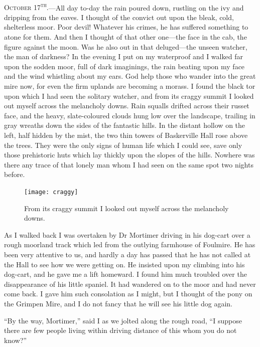 \documentclass[paper=5.5in:8.5in,BCOR=7mm,twoside,DIV=calc,12pt,usegeometry,openany,chapterprefix,endperiod]{scrbook} %
\begin{document}
~\\

\textsc{October 17\textsuperscript{th}.}\nobreakdash---All day to-day the rain poured down, rustling on the ivy and dripping from the eaves. I thought of the convict out upon the bleak, cold, shelterless moor. Poor devil! Whatever his crimes, he has suffered something to atone for them. And then I thought of that other one\nobreakdash---the face in the cab, the figure against the moon. Was he also out in that deluged\nobreakdash---the unseen watcher, the man of darkness? In the evening I put on my waterproof and I walked far upon the sodden moor, full of dark imaginings, the rain beating upon my face and the wind whistling about my ears. God help those who wander into the great mire now, for even the firm uplands are becoming a morass. I found the black tor upon which I had seen the solitary watcher, and from its craggy summit I looked out myself across the melancholy downs. Rain squalls drifted across their russet face, and the heavy, slate-coloured clouds hung low over the landscape, trailing in gray wreaths down the sides of the fantastic hills. In the distant hollow on the left, half hidden by the mist, the two thin towers of Baskerville Hall rose above the trees. They were the only signs of human life which I could see, save only those prehistoric huts which lay thickly upon the slopes of the hills. Nowhere was there any trace of that lonely man whom I had seen on the same spot two nights before.

\begin{figure}[tbph]
\centering
\texttt{[image: craggy]}
\caption{From its craggy summit I looked out myself across the melancholy downs.}
\end{figure}

As I walked back I was overtaken by Dr Mortimer driving in his dog-cart over a rough moorland track which led from the outlying farmhouse of Foulmire. He has been very attentive to us, and hardly a day has passed that he has not called at the Hall to see how we were getting on. He insisted upon my climbing into his dog-cart, and he gave me a lift homeward. I found him much troubled over the disappearance of his little spaniel. It had wandered on to the moor and had never come back. I gave him such consolation as I might, but I thought of the pony on the Grimpen Mire, and I do not fancy that he will see his little dog again.

\enquote{By the way, Mortimer,} said I as we jolted along the rough road, \enquote{I suppose there are few people living within driving distance of this whom you do not know?}
\end{document}
